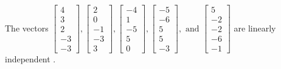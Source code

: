 \begin{exercise}
\begin{exerciseStatement}
  \end{exerciseStatement}
  \begin{exerciseAnswer}
   The vectors \(\left[\begin{array}{r}
4 \\
3 \\
2 \\
-3 \\
-3
\end{array}\right] , \left[\begin{array}{r}
2 \\
0 \\
-1 \\
-3 \\
3
\end{array}\right] , \left[\begin{array}{r}
-4 \\
1 \\
-5 \\
5 \\
0
\end{array}\right] , \left[\begin{array}{r}
-5 \\
-6 \\
5 \\
5 \\
-3
\end{array}\right] , \text{ and } \left[\begin{array}{r}
5 \\
-2 \\
-2 \\
-6 \\
-1
\end{array}\right]\) are 
  	 linearly independent  .
  


  \end{exerciseAnswer}
\end{exercise}